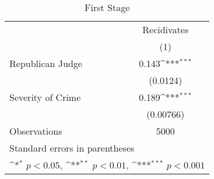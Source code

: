 \begin{table}[htbp]\centering
\def\sym#1{\ifmmode^{#1}\else\(^{#1}\)\fi}
\caption{\label{tab:assignment4} First Stage}
\begin{tabular*}{\hsize}{@{\hskip\tabcolsep\extracolsep\fill}l*{1}{c}}
\hline\hline
                    &\multicolumn{1}{c}{Recidivates}\\
                    &\multicolumn{1}{c}{(1)}         \\
\hline
Republican Judge    &       0.143\sym{***}\\
                    &    (0.0124)         \\
[1em]
Severity of Crime   &       0.189\sym{***}\\
                    &   (0.00766)         \\
\hline
Observations        &        5000         \\
\hline\hline
\multicolumn{2}{l}{\footnotesize Standard errors in parentheses}\\
\multicolumn{2}{l}{\footnotesize \sym{*} \(p<0.05\), \sym{**} \(p<0.01\), \sym{***} \(p<0.001\)}\\
\end{tabular*}
\end{table}
